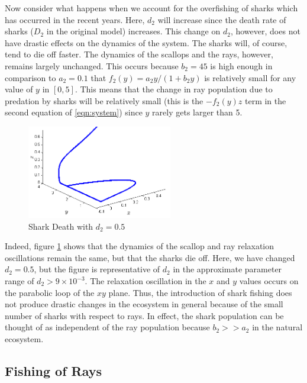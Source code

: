 \documentclass[12pt,journal,compsoc,twoside]{IEEEtran}
\begin{document}
Now consider what happens when we account for the overfishing of sharks which has occurred in the recent years. Here, $d_2$ will increase since the death rate of sharks ($D_2$ in the original model) increases. This change on $d_2$, however, does not have drastic effects on the dynamics of the system. The sharks will, of course, tend to die off faster. The dynamics of the scallops and the rays, however, remains largely unchanged. This occurs because $b_2 = 45$ is high enough in comparison to $a_2 = 0.1$ that $f_2(y) = a_2 y / (1 + b_2 y)$ is relatively small for any value of $y$ in $[0,5]$. This means that the change in ray population due to predation by sharks will be relatively small (this is the $-f_2(y) z$ term in the second equation of \ref{eqn:system}) since $y$ rarely gets larger than 5.
\begin{figure}[h!]
\centering
\includegraphics[width=2.5in]{sharkdeath.png}
\caption{Shark Death with $d_2 = 0.5$}
\label{sharkdeath}
\end{figure}

Indeed, figure \ref{sharkdeath} shows that the dynamics of the scallop and ray relaxation oscillations remain the same, but that the sharks die off. Here, we have changed $d_2 = 0.5$, but the figure is representative of $d_2$ in the approximate parameter range of $d_2 > 9 \times 10^{-3}$. The relaxation oscillation in the $x$ and $y$ values occurs on the parabolic loop of the $xy$ plane. Thus, the introduction of shark fishing does not produce drastic changes in the ecosystem in general because of the small number of sharks with respect to rays. In effect, the shark population can be thought of as independent of the ray population because $b_2 >> a_2$ in the natural ecosystem.

\subsection{Fishing of Rays}
\end{document}
